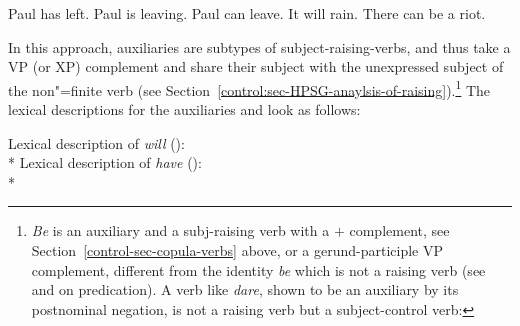 	
\begin{exe}
\ex \begin{xlist}
\ex Paul has left.
\ex Paul is leaving.
\ex Paul can leave.
\ex It will rain.
\ex There can be a riot.
\end{xlist}	
\end{exe}

In this approach,  auxiliaries are subtypes of subject-raising-verbs, and thus take a VP (or
XP) complement and share their subject with the unexpressed subject of the non"=finite verb (see Section~\ref{control:sec-HPSG-anaylsis-of-raising}).\footnote{ \emph{Be} is an auxiliary and a subj-raising verb with a \prd$+$ complement, see
  Section~\ref{control-sec-copula-verbs} above, or a gerund-participle VP complement,
  different from the identity \emph{be} which is not a raising verb (see  and
   on predication). A verb like \emph{dare}, shown to be an auxiliary by
  its postnominal negation, is not a raising verb but a subject-control verb:
\eal
{}
\zllast
}
The lexical descriptions for the auxiliaries  and  look as follows: 

\ea
Lexical description of \emph{will} ():\\*
\z
\eas
Lexical description of \emph{have} ():\\*
\zs

